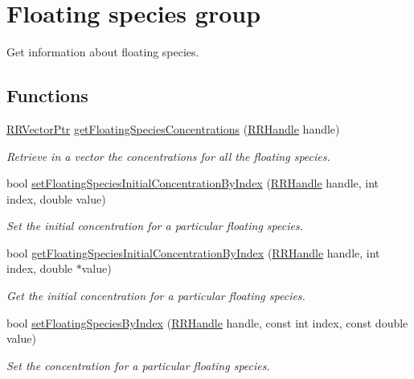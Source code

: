 \hypertarget{group__floating}{\section{Floating species group}
\label{group__floating}
}


Get information about floating species.  


\subsection*{Functions}
\begin{DoxyCompactItemize}
\item 
\hyperlink{rrc__types_8h_a3be72d6006034fd349f753d2bf441bf7}{R\-R\-Vector\-Ptr} \hyperlink{group__floating_ga68e7a5d2a51820bdfe9eb96a0e67c53c}{get\-Floating\-Species\-Concentrations} (\hyperlink{rrc__types_8h_a1d68f0592372208fa5a5f2799ea4b3ae}{R\-R\-Handle} handle)
\begin{DoxyCompactList}\small\item\em Retrieve in a vector the concentrations for all the floating species. \end{DoxyCompactList}\item 
bool \hyperlink{group__floating_ga0cd4f0808862786a6cf7019f9d1d7d01}{set\-Floating\-Species\-Initial\-Concentration\-By\-Index} (\hyperlink{rrc__types_8h_a1d68f0592372208fa5a5f2799ea4b3ae}{R\-R\-Handle} handle, int index, double value)
\begin{DoxyCompactList}\small\item\em Set the initial concentration for a particular floating species. \end{DoxyCompactList}\item 
bool \hyperlink{group__floating_ga18817e95a20396665311107be6cbcde6}{get\-Floating\-Species\-Initial\-Concentration\-By\-Index} (\hyperlink{rrc__types_8h_a1d68f0592372208fa5a5f2799ea4b3ae}{R\-R\-Handle} handle, int index, double $\ast$value)
\begin{DoxyCompactList}\small\item\em Get the initial concentration for a particular floating species. \end{DoxyCompactList}\item 
bool \hyperlink{group__floating_gad77c7ee6b6edad962659d16f20497dd6}{set\-Floating\-Species\-By\-Index} (\hyperlink{rrc__types_8h_a1d68f0592372208fa5a5f2799ea4b3ae}{R\-R\-Handle} handle, const int index, const double value)
\begin{DoxyCompactList}\small\item\em Set the concentration for a particular floating species. \end{DoxyCompactList}\item 

\end{DoxyCompactItemize}
